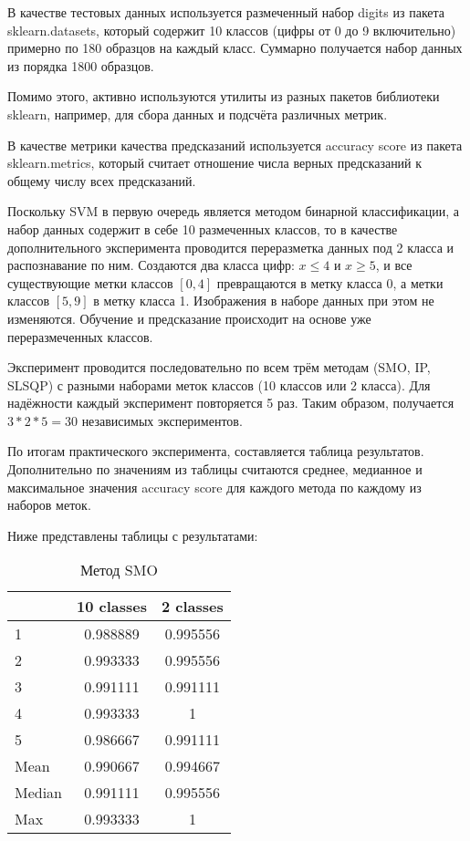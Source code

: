 В качестве тестовых данных используется размеченный набор digits из пакета sklearn.datasets, который содержит 10 классов (цифры от 0 до 9 включительно) примерно по 180 образцов на каждый класс. Суммарно получается набор данных из порядка 1800 образцов.

Помимо этого, активно используются утилиты из разных пакетов библиотеки sklearn, например, для сбора данных и подсчёта различных метрик.

В качестве метрики качества предсказаний используется accuracy score из пакета sklearn.metrics, который считает отношение числа верных предсказаний к общему числу всех предсказаний.

Поскольку SVM в первую очередь является методом бинарной классификации, а набор данных содержит в себе 10 размеченных классов, то в качестве дополнительного эксперимента проводится переразметка данных под 2 класса и распознавание по ним. Создаются два класса цифр: $x \leq 4$ и $x \geq 5$, и все существующие метки классов $[0, 4]$ превращаются в метку класса 0, а метки классов $[5, 9]$ в метку класса 1. Изображения в наборе данных при этом не изменяются. Обучение и предсказание происходит на основе уже переразмеченных классов.

Эксперимент проводится последовательно по всем трём методам (SMO, IP, SLSQP) с разными наборами меток классов (10 классов или 2 класса). Для надёжности каждый эксперимент повторяется 5 раз. Таким образом, получается $3 * 2 * 5 = 30$ независимых экспериментов.

По итогам практического эксперимента, составляется таблица результатов. Дополнительно по значениям из таблицы считаются среднее, медианное и максимальное значения accuracy score для каждого метода по каждому из наборов меток.

Ниже представлены таблицы с результатами:

\begin{table}[H]
    \centering
    \begin{tabular}{|l||c|c|}
        \hline
        & 10 classes & 2 classes \\\hline\hline
        1 & 0.988889 & 0.995556 \\\hline
        2 & 0.993333 & 0.995556 \\\hline
        3 & 0.991111 & 0.991111 \\\hline
        4 & 0.993333 & 1 \\\hline
        5 & 0.986667 & 0.991111 \\\hline
        Mean & 0.990667 & 0.994667 \\\hline
        Median & 0.991111 & 0.995556 \\\hline
        Max & 0.993333 & 1 \\\hline
    \end{tabular}
    \caption{Метод SMO}
\end{table}

